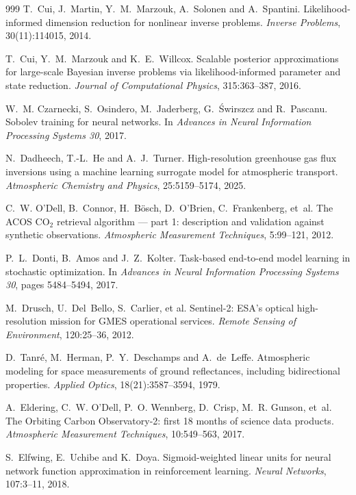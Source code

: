 \begin{thebibliography}{999}
T.~Cui, J.~Martin, Y.~M.~Marzouk, A.~Solonen and A.~Spantini.
\newblock Likelihood-informed dimension reduction for nonlinear inverse problems.
\newblock \emph{Inverse Problems}, 30(11):114015, 2014.

T.~Cui, Y.~M.~Marzouk and K.~E.~Willcox.
\newblock Scalable posterior approximations for large-scale Bayesian inverse problems via likelihood-informed parameter and state reduction.
\newblock \emph{Journal of Computational Physics}, 315:363--387, 2016.

W.~M. Czarnecki, S.~Osindero, M.~Jaderberg, G.~\'Swirszcz and R.~Pascanu.
\newblock Sobolev training for neural networks.
\newblock In \emph{Advances in Neural Information Processing Systems 30}, 2017.

N.~Dadheech, T.-L.~He and A.~J.~Turner.
\newblock High-resolution greenhouse gas flux inversions using a machine learning surrogate model for atmospheric transport.
\newblock \emph{Atmospheric Chemistry and Physics}, 25:5159--5174, 2025.

C.~W. O'Dell, B.~Connor, H.~B{\"o}sch, D.~O'Brien, C.~Frankenberg, et~al.
\newblock The {ACOS} {CO$_2$} retrieval algorithm --- part 1: description and validation
against synthetic observations.
\newblock \emph{Atmospheric Measurement Techniques}, 5:99--121, 2012.

P.~L.~Donti, B.~Amos and J.~Z.~Kolter.
\newblock Task-based end-to-end model learning in stochastic optimization.
\newblock In \emph{Advances in Neural Information Processing Systems 30}, pages 5484--5494, 2017.

M.~Drusch, U.~Del~Bello, S.~Carlier, et al.
\newblock Sentinel-2: ESA's optical high-resolution mission for GMES operational services.
\newblock \emph{Remote Sensing of Environment}, 120:25--36, 2012.

D.~Tanr\'e, M.~Herman, P.~Y.~Deschamps and A.~de~Leffe.
\newblock Atmospheric modeling for space measurements of ground reflectances, including bidirectional properties.
\newblock \emph{Applied Optics}, 18(21):3587--3594, 1979.

A.~Eldering, C.~W. O'Dell, P.~O. Wennberg, D.~Crisp, M.~R. Gunson, et~al.
\newblock The {Orbiting Carbon Observatory-2}: first 18 months of science data products.
\newblock \emph{Atmospheric Measurement Techniques}, 10:549--563, 2017.

S.~Elfwing, E.~Uchibe and K.~Doya.
\newblock Sigmoid-weighted linear units for neural network function approximation in reinforcement learning.
\newblock \emph{Neural Networks}, 107:3--11, 2018.


\end{thebibliography}
